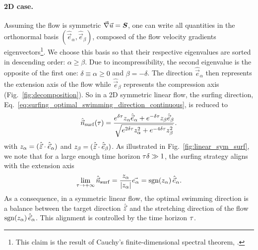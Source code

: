 \paragraph{2D case.}
Assuming the flow is symmetric $\vec{\nabla} \vec{u} = \boldsymbol{S}$, one can write all quantities in the orthonormal basis $(\hat{\vec{e}}_{\alpha}, \hat{\vec{e}}_{\beta})$, composed of the flow velocity gradients eigenvectors\footnote{This claim is the result of Cauchy's finite-dimensional spectral theorem, \citep{hawkins1975cauchy}.}.
We choose this basis so that their respective eigenvalues are sorted in descending order: $\alpha \ge \beta$. 
Due to incompressibility, the second eigenvalue is the opposite of the first one: $\delta \equiv \alpha \ge 0$ and $\beta = -\delta$.
The direction $\hat{\vec{e}}_{\alpha}$ then represents the extension axis of the flow while $\hat{\vec{e}}_{\beta}$ represents the compression axis (Fig.~\ref{fig:decomposition}).
So in a 2D symmetric linear flow, the surfing direction, Eq.~\eqref{eq:surfing_optimal_swimming_direction_continuous}, is reduced to
\begin{equation}
	\label{eq:optimal_swimming_direction_sym}
	\hat{\vec{n}}_{\mathrm{surf}}(\tau) = \frac{e^{\delta \tau} z_\alpha \hat{\vec{e}}_{\alpha} + e^{-\delta \tau} z_\beta \hat{\vec{e}}_{\beta}}{\sqrt{e^{2 \delta \tau} z_\alpha^2 + e^{-4 \delta \tau} z_\beta^2}}.
\end{equation}
with $z_\alpha = ( \hat{\vec{z}} \cdot \hat{\vec{e}}_{\alpha} )$ and $z_\beta = ( \hat{\vec{z}} \cdot \hat{\vec{e}}_{\beta} )$.
As illustrated in Fig.~\ref{fig:linear_sym_surf}, we note that for a large enough time horizon $\tau \delta \gg 1$, the surfing strategy aligns with the extension axis
\begin{equation}
	\label{eq:optimal_swimming_direction_sym_lim}
	\lim_{\tau \to +\infty} \hat{\vec{n}}_{\mathrm{surf}} = \frac{z_{\alpha}}{\lvert z_{\alpha}\rvert} \vec{e_{\alpha}} = \operatorname{sgn}(z_{\alpha}) \, \hat{\vec{e}}_{\alpha}.
\end{equation}
As a consequence, in a symmetric linear flow, the optimal swimming direction is a balance between the target direction $\hat{\vec{z}}$ and the stretching direction of the flow $\operatorname{sgn}(z_{\alpha}) \, \hat{\vec{e}}_{\alpha}$. 
This alignment is controlled by the time horizon $\tau$.
